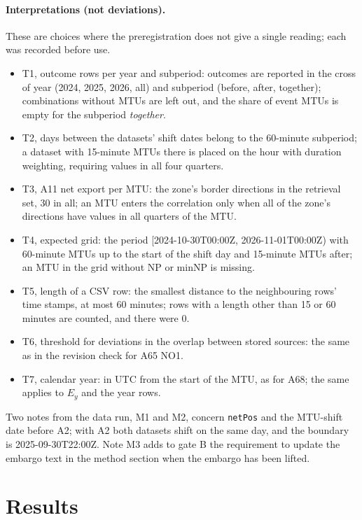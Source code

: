 \paragraph{Interpretations (not deviations).}
These are choices where the preregistration does not give a single reading; each was recorded before use.
\begin{itemize}
\item T1, outcome rows per year and subperiod: outcomes are reported in the cross of year (2024, 2025, 2026, all) and subperiod (before, after, together); combinations without MTUs are left out, and the share of event MTUs is empty for the subperiod \emph{together}. %
\item T2, days between the datasets' shift dates belong to the 60-minute subperiod; a dataset with 15-minute MTUs there is placed on the hour with duration weighting, requiring values in all four quarters. %
\item T3, A11 net export per MTU: the zone's border directions in the retrieval set, 30 in all; an MTU enters the correlation only when all of the zone's directions have values in all quarters of the MTU. %
\item T4, expected grid: the period [2024-10-30T00:00Z, 2026-11-01T00:00Z) with 60-minute MTUs up to the start of the shift day and 15-minute MTUs after; an MTU in the grid without NP or minNP is missing. %
\item T5, length of a CSV row: the smallest distance to the neighbouring rows' time stamps, at most 60 minutes; rows with a length other than 15 or 60 minutes are counted, and there were 0. %
\item T6, threshold for deviations in the overlap between stored sources: the same as in the revision check for A65 NO1. %
\item T7, calendar year: in UTC from the start of the MTU, as for A68; the same applies to $E_y$ and the year rows. %
\end{itemize}
Two notes from the data run, M1 and M2, concern \texttt{netPos} and the MTU-shift date before A2; with A2 both datasets shift on the same day, and the boundary is 2025-09-30T22:00Z. %
Note M3 adds to gate B the requirement to update the embargo text in the method section when the embargo has been lifted. %

\section{Results}
\label{sec:res}

